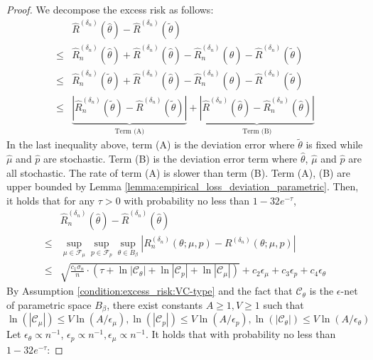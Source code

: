 \documentclass[12pt]{article}
\begin{document}
\begin{proof}
 We decompose the excess risk as follows:
    \begin{align*}
   &\widehat R^{({\delta_n})}(\widehat\theta) - \widehat R^{({\delta_n})}(\tilde\theta)\\
   \leq & \widehat R_n^{({\delta_n})}(\widehat\theta)+\widehat R^{({\delta_n})}(\widehat\theta)  - \widehat R_n^{({\delta_n})}(\widehat\theta) - \widehat R^{({\delta_n})}(\tilde\theta)\\
   \leq & \widehat R_n^{({\delta_n})}(\tilde\theta)+\widehat R^{({\delta_n})}(\widehat\theta)  - \widehat R_n^{({\delta_n})}(\widehat\theta) - \widehat R^{({\delta_n})}(\tilde\theta)\\
   \leq & \underbrace{\left|\widehat R_n^{({\delta_n})}(\tilde\theta) - \widehat R^{({\delta_n})}(\tilde\theta)\right|}_{\text{Term (A)}} + \underbrace{
   \left|\widehat R^{({\delta_n})}(\widehat\theta)
     -\widehat R_n^{({\delta_n})}(\widehat\theta)\right|}_{\text{Term  (B)}}
\end{align*}
In the last inequality above, term (A) is the deviation error where $\tilde\theta$ is fixed while $\widehat \mu$ and $\widehat p$ are stochastic. Term (B) is the deviation error term where  $\widehat\theta$, $\widehat \mu$ and $\widehat p$ are all stochastic. The rate of term (A) is slower than term (B). Term (A), (B) are upper bounded by Lemma \ref{lemma:empirical_loss_deviation_parametric}. Then, it holds that for any $\tau>0$ with probability no less than $1-32e^{-\tau}$,
\begin{align*}
   &\widehat R_n^{({\delta_n})}(\widehat\theta) - \widehat R^{({\delta_n})}(\widehat\theta)\\
   \leq &\sup_{\mu\in\mathcal{F}_\mu}\sup_{p\in\mathcal{F}_p}\sup_{\theta\in B_{\beta}}\left| R_n^{({\delta_n})}(\theta;\mu,p) - R^{({\delta_n})}(\theta;\mu,p)\right|\\
    \leq &\sqrt{\frac{ c_1\sigma_n}{n}\cdot\left(\tau +\ln|\mathcal{C}_\theta|+\ln|\mathcal{C}_p|+\ln|\mathcal{C}_\mu|\right)} + c_2\epsilon_\mu + c_3\epsilon_p + c_4\epsilon_\theta
\end{align*}
By Assumption \ref{condition:excess_risk:VC-type} and the fact that $\mathcal{C}_\theta$ is the $\epsilon$-net of parametric space $B_\beta$, there exist constants $A\geq 1, V\geq 1$ such that $$\ln(|\mathcal{C}_\mu|)\leq V\ln\left(A/\epsilon_\mu\right),\ln(|\mathcal{C}_p|)\leq V\ln\left(A/\epsilon_p\right),\ln(|\mathcal{C}_\theta|)\leq V\ln\left(A/\epsilon_\theta\right)$$
Let $\epsilon_\theta \propto n^{-1}$, $\epsilon_p \propto n^{-1}, \epsilon_\mu\propto n^{-1}$. It holds that with probability no less than $1-32e^{-\tau}$:

\end{proof}
\end{document}
